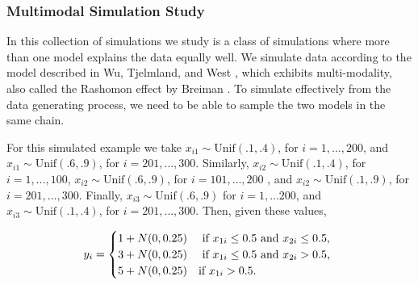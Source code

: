 %

\subsubsection{Multimodal Simulation Study}
In this collection of simulations we study is a class of simulations where more than one model explains the data equally well. We simulate data according to the model described in Wu, Tjelmland, and West \cite{wu2007bayesian}, which exhibits multi-modality, also called the Rashomon effect by Breiman \cite{breiman2001statistical}. To simulate effectively from the data generating process, we need to be able to sample the two models in the same chain. 

For this simulated example we take $x_{i1} \sim \text{Unif}(.1,.4)$, for $i=1,\dots ,200$, and $x_{i1} \sim \text{Unif}(.6,.9)$, for $i=201,\dots,300$. Similarly, $x_{i2} \sim \text{Unif}(.1,.4)$, for $i=1,\dots ,100$, $x_{i2} \sim \text{Unif}(.6,.9)$, for $i=101, \dots,200$ , and $x_{i2} \sim \text{Unif}(.1,.9)$, for $i=201, \dots,300$. Finally, $x_{i3} \sim \text{Unif}(.6,.9)$ for $i =1, \dots 200$, and $x_{i3} \sim \text{Unif}(.1,.4)$, for $i=201, \dots,300$. Then, given these values, 

\[
 y_i =
  \begin{cases} 
      \hfill 1+N(0,0.25)    \hfill & \text{ if $x_{1i} \leq 0.5$ and $x_{2i} \leq 0.5$, } \\
      \hfill 3+ N(0,0.25) \hfill & \text{ if $x_{1i} \leq 0.5$ and $x_{2i} > 0.5$, } \\
      \hfill 5+ N(0,0.25) \hfill & \text{if $x_{1i} > 0.5$. }\\
  \end{cases}
\]

